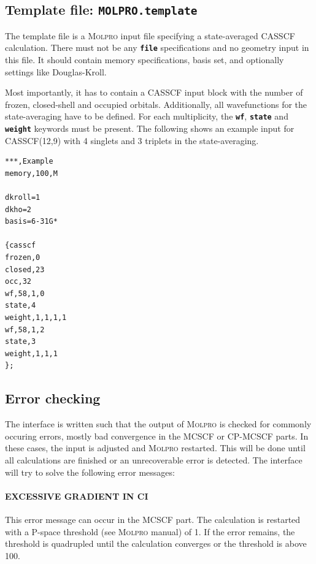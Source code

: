 \documentclass[a4paper,11pt,DIV=15,openany,twoside=false]{scrbook}
\newcommand{\ttt}[1]{\textbf{\texttt{#1}}}
\newenvironment{example}{
  \vspace{0mm}
  \definecolor{shadecolor}{HTML}{BBDDFF}
  \begin{shaded}
  \begin{minipage}{0.9\textwidth}
}{
  \end{minipage}
  \end{shaded}
}
\begin{document}
\subsection{Template file: \ttt{MOLPRO.template}}

The template file is a \textsc{Molpro} input file specifying a state-averaged CASSCF calculation. There must not be any \ttt{file} specifications and no geometry input in this file. It should contain memory specifications, basis set, and optionally settings like Douglas-Kroll.

Most importantly, it has to contain a CASSCF input block with the number of frozen, closed-shell and occupied orbitals. Additionally, all wavefunctions for the state-averaging have to be defined. For each multiplicity, the \ttt{wf}, \ttt{state} and \ttt{weight} keywords must be present. The following shows an example input for CASSCF(12,9) with 4 singlets and 3 triplets in the state-averaging.
\begin{example}
  \begin{verbatim}
***,Example
memory,100,M

dkroll=1
dkho=2
basis=6-31G*

{casscf
frozen,0
closed,23
occ,32
wf,58,1,0
state,4
weight,1,1,1,1
wf,58,1,2
state,3
weight,1,1,1
};
  \end{verbatim}
\end{example}

\subsection{Error checking}

The interface is written such that the output of \textsc{Molpro} is checked for commonly occuring errors, mostly bad convergence in the MCSCF or CP-MCSCF parts. In these cases, the input is adjusted and \textsc{Molpro} restarted. This will be done until all calculations are finished or an unrecoverable error is detected.
The interface will try to solve the following error messages:

\paragraph{EXCESSIVE GRADIENT IN CI} This error message can occur in the MCSCF part. The calculation is restarted with a P-space threshold (see \textsc{Molpro} manual) of 1. If the error remains, the threshold is quadrupled until the calculation converges or the threshold is above 100.
\end{document}
